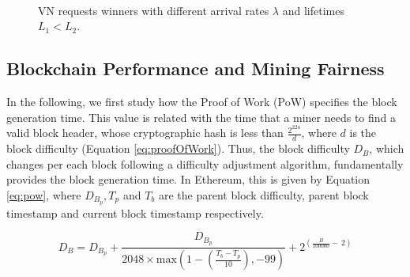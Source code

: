\begin{figure}[t]
	\myfloatalign
	 \quad
	 \\
	\caption{VN requests winners with different arrival rates $\lambda$ and lifetimes $L_1 < L_2$.}
	\label{fig:winners}
\end{figure}


\subsection{Blockchain Performance and Mining Fairness} \label{resultsBlock}

In the following, we first study how the Proof of Work (PoW) specifies the block generation time. This value is related with the time that a miner needs to find a valid block header, whose cryptographic hash is less than $\frac{2^{224}}{d}$, where $d$ is the block difficulty (Equation \ref{eq:proofOfWork}). Thus, the block difficulty $D_B$, which changes per each block following a difficulty adjustment algorithm, fundamentally provides the block generation time. In Ethereum, this is given by Equation \ref{eq:pow}, where $D_{B_p}, T_p$ and $T_b$ are the parent block difficulty, parent block timestamp and current block timestamp respectively.

\begin{equation} \label{eq:pow}
 D_B = D_{B_p} + \frac{D_{B_p}}{2048 \times \text{max}(1-(\frac{T_b - T_p}{10}), -99)} + 2^{(\frac{B}{100000} - \ 2)} 
  \end{equation}

